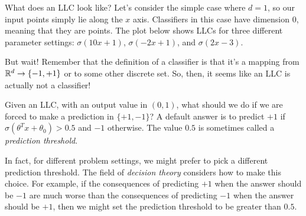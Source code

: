 
What does an LLC look like?   Let's consider the
simple case where $d = 1$, so our input points simply lie along the
$x$ axis.  Classifiers in this case have dimension $0$, meaning that
they are points.
The plot below shows LLCs for three different parameter
settings: $\sigma(10x + 1)$, $\sigma(-2x + 1)$, and $\sigma(2x - 3).$
\begin{center}
\end{center}

But wait!  Remember that the definition of a classifier is that it's a mapping from $\mathbb{R}^d
  \rightarrow \{-1, +1\}$ or to some other discrete set.  So, then, it
seems like an LLC is actually not a classifier!

Given an LLC, with an output value in $(0, 1)$, what should we do if
we are forced to make a prediction in $\{+1, -1\}$?  A default answer
is to predict $+1$ if $\sigma(\theta^T x + \theta_0) > 0.5$ and $-1$
otherwise.  The value $0.5$ is sometimes called a {\em prediction
    threshold}.

In fact, for different problem settings, we might prefer to pick a
different prediction threshold.  The field of {\em decision theory}
considers how to make this choice.
For example, if the consequences of predicting $+1$ when
the answer should be $-1$ are much worse than the consequences of
predicting $-1$ when the answer should be $+1$, then we might set the
prediction threshold to be greater than $0.5$.

